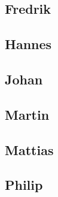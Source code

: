\documentclass[a4paper]{article}
\begin{document}
  \subsection{Fredrik}
  \subsection{Hannes}
  \subsection{Johan}
  \subsection{Martin}
  \subsection{Mattias}
  \subsection{Philip}
\end{document}
